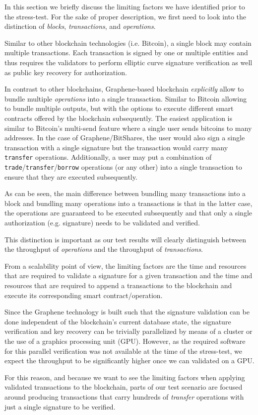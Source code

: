 In this section we briefly discuss the limiting factors we have identified
prior to the stress-test. For the sake of proper description, we first need to
look into the distinction of \emph{blocks}, \emph{transactions}, and
\emph{operations}.

Similar to other blockchain technologies (i.e. Bitcoin), a single block may
contain multiple transactions. Each transaction is signed by one or multiple
entities and thus requires the validators to perform elliptic curve signature
verification as well as public key recovery for authorization.

In contrast to other blockchains, Graphene-based blockchain \emph{explicitly}
allow to bundle multiple \emph{operations} into a single transaction. Similar
to Bitcoin allowing to bundle multiple outputs, but with the options to execute
different smart contracts offered by the blockchain subsequently. The easiest
application is similar to Bitcoin's multi-send feature where a single user
sends bitcoins to many addresses. In the case of Graphene/BitShares, the user
would also sign a single transaction with a single signature but the
transaction would carry many \texttt{transfer} operations. Additionally, a
user may put a combination of \texttt{trade}/\texttt{transfer}/\texttt{borrow}
operations (or any other) into a single transaction to ensure that they are
executed subsequently.

As can be seen, the main difference between bundling many transactions into a
block and bundling many operations into a transactions is that in the latter
case, the operations are guaranteed to be executed subsequently and that only a
single authorization (e.g. signature) needs to be validated and verified.

This distinction is important as our test results will clearly distinguish
between the throughput of \emph{operations} and the throughput of
\emph{transactions}.

From a scalability point of view, the limiting factors are the time and
resources that are required to validate a signature for a given transaction and
the time and resources that are required to append a transactions to the
blockchain and execute its corresponding smart contract/operation.

Since the Graphene technology is built such that the signature validation can
be done independent of the blockchain's current database state, the signature
verification and key recovery can be trivially parallelized by means of a
cluster or the use of a graphics processing unit (GPU). However, as the
required software for this parallel verification was not available at the time
of the stress-test, we expect the throughput to be significantly higher once we
can validated on a GPU.

For this reason, and because we want to see the limiting factors when applying
validated transactions to the blockchain, parts of our test scenario are
focused around producing transactions that carry hundreds of \emph{transfer}
operations with just a single signature to be verified.
